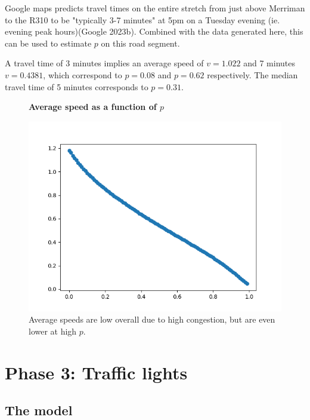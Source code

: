 \documentclass{article}
\begin{document}
Google maps predicts travel times on the entire stretch from just above Merriman to the R310 to be "typically 3-7 minutes" at 5pm on a Tuesday evening (ie. evening peak hours)(Google 2023b). Combined with the data generated here, this can be used to estimate $p$ on this road segment.

A travel time of 3 minutes implies an average speed of $v=1.022$ and 7 minutes $v=0.4381$, which correspond to $p=0.08$ and $p=0.62$ respectively. The median travel time of 5 minutes corresponds to $p=0.31$.

\begin{figure}
\textbf{\large Average speed as a function of $p$}\par\medskip
{}
\includegraphics[scale = 0.55, left]{./data/phase2/v_vs_p.png}
\vspace*{0.1cm}\hspace*{4.5cm}{\large $p$}
\caption{\label{fig} Average speeds are low overall due to high congestion, but are even lower at high $p$.}
\end{figure}

\section*{Phase 3: Traffic lights}

\subsection*{The model}
\end{document}
